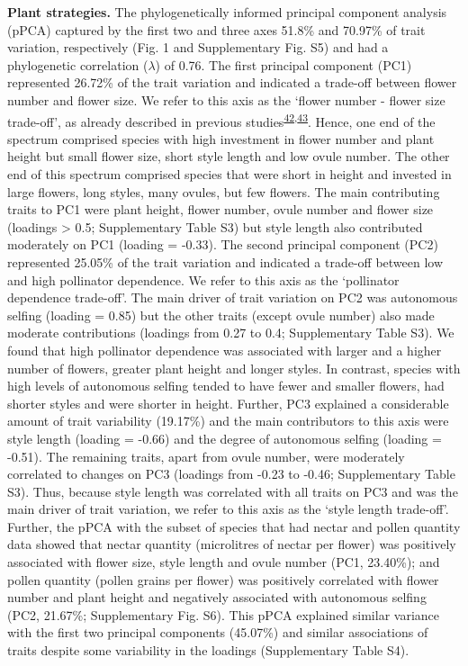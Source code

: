 \documentclass[12pt,a4paper,]{article}
\begin{document}
\textbf{Plant strategies.} The phylogenetically informed principal
component analysis (pPCA) captured by the first two and three axes
51.8\% and 70.97\% of trait variation, respectively (Fig. 1 and
Supplementary Fig. S5) and had a phylogenetic correlation (\(\lambda\))
of 0.76. The first principal component (PC1) represented 26.72\% of the
trait variation and indicated a trade-off between flower number and
flower size. We refer to this axis as the `flower number - flower size
trade-off', as already described in previous
studies\textsuperscript{\protect\hyperlink{ref-sargent2007}{42},\protect\hyperlink{ref-kettle2011}{43}}.
Hence, one end of the spectrum comprised species with high investment in
flower number and plant height but small flower size, short style length
and low ovule number. The other end of this spectrum comprised species
that were short in height and invested in large flowers, long styles,
many ovules, but few flowers. The main contributing traits to PC1 were
plant height, flower number, ovule number and flower size (loadings
\textgreater{} \textbar{}0.5\textbar{}; Supplementary Table S3) but
style length also contributed moderately on PC1 (loading = -0.33). The
second principal component (PC2) represented 25.05\% of the trait
variation and indicated a trade-off between low and high pollinator
dependence. We refer to this axis as the `pollinator dependence
trade-off'. The main driver of trait variation on PC2 was autonomous
selfing (loading = 0.85) but the other traits (except ovule number) also
made moderate contributions (loadings from 0.27 to 0.4; Supplementary
Table S3). We found that high pollinator dependence was associated with
larger and a higher number of flowers, greater plant height and longer
styles. In contrast, species with high levels of autonomous selfing
tended to have fewer and smaller flowers, had shorter styles and were
shorter in height. Further, PC3 explained a considerable amount of trait
variability (19.17\%) and the main contributors to this axis were style
length (loading = -0.66) and the degree of autonomous selfing (loading =
-0.51). The remaining traits, apart from ovule number, were moderately
correlated to changes on PC3 (loadings from -0.23 to -0.46;
Supplementary Table S3). Thus, because style length was correlated with
all traits on PC3 and was the main driver of trait variation, we refer
to this axis as the `style length trade-off'. Further, the pPCA with the
subset of species that had nectar and pollen quantity data showed that
nectar quantity (microlitres of nectar per flower) was positively
associated with flower size, style length and ovule number (PC1,
23.40\%); and pollen quantity (pollen grains per flower) was positively
correlated with flower number and plant height and negatively associated
with autonomous selfing (PC2, 21.67\%; Supplementary Fig. S6). This pPCA
explained similar variance with the first two principal components
(45.07\%) and similar associations of traits despite some variability in
the loadings (Supplementary Table S4).
\end{document}
